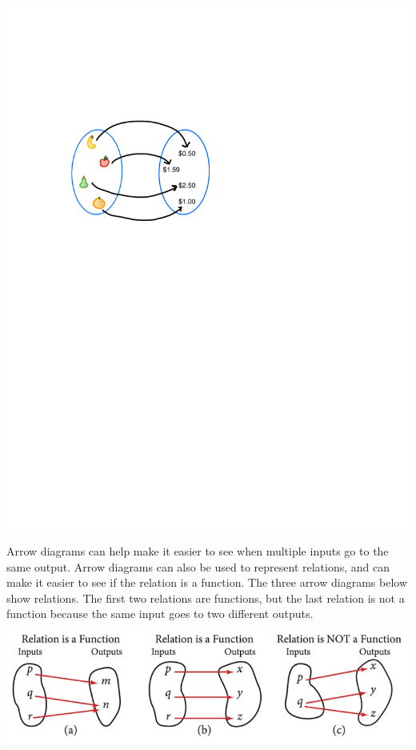 \documentclass{ximera}
\begin{document}
\begin{image}
\includegraphics{WiaF-arrowDiagram.pdf}
\end{image}

Arrow diagrams can help make it easier to see when multiple inputs go to the same output.  Arrow diagrams can also be used to represent relations, and can make it easier to see if the relation is a function. The three arrow diagrams below show relations.  The first two relations are functions, but the last relation is not a function because the same input goes to two different outputs.

\begin{image}
\includegraphics[width=\textwidth]{FunctionsVsRelations.jpg}  
\end{image}
\end{document}

